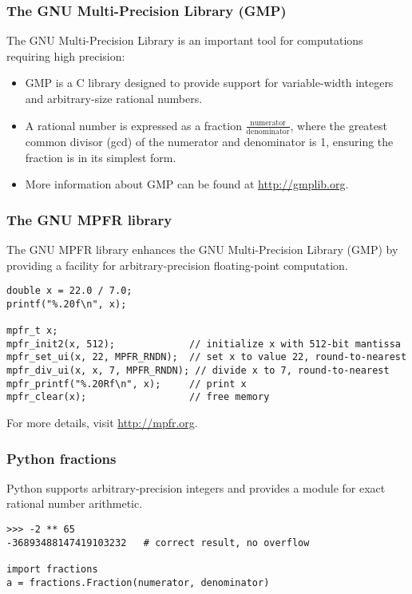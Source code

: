\documentclass[12pt]{article}
\begin{document}
\subsubsection{The GNU Multi-Precision Library (GMP)}
The GNU Multi-Precision Library is an important tool for computations requiring high precision:

\begin{itemize}
    \item GMP is a C library designed to provide support for variable-width integers and arbitrary-size rational numbers.
    \item A rational number is expressed as a fraction \( \frac{\text{numerator}}{\text{denominator}} \), where the greatest common divisor (gcd) of the numerator and denominator is 1, ensuring the fraction is in its simplest form.
    \item More information about GMP can be found at \url{http://gmplib.org}.
\end{itemize}


\subsubsection{The GNU MPFR library}
The GNU MPFR library enhances the GNU Multi-Precision Library (GMP) by providing a facility for arbitrary-precision floating-point computation.

\begin{verbatim}
double x = 22.0 / 7.0;
printf("%.20f\n", x);

mpfr_t x;
mpfr_init2(x, 512);             // initialize x with 512-bit mantissa
mpfr_set_ui(x, 22, MPFR_RNDN);  // set x to value 22, round-to-nearest
mpfr_div_ui(x, x, 7, MPFR_RNDN); // divide x to 7, round-to-nearest
mpfr_printf("%.20Rf\n", x);     // print x
mpfr_clear(x);                  // free memory
\end{verbatim}

For more details, visit \url{http://mpfr.org}.

\subsubsection{Python fractions}
Python supports arbitrary-precision integers and provides a module for exact rational number arithmetic.

\begin{verbatim}
>>> -2 ** 65
-36893488147419103232   # correct result, no overflow

import fractions
a = fractions.Fraction(numerator, denominator)
\end{verbatim}
\end{document}
